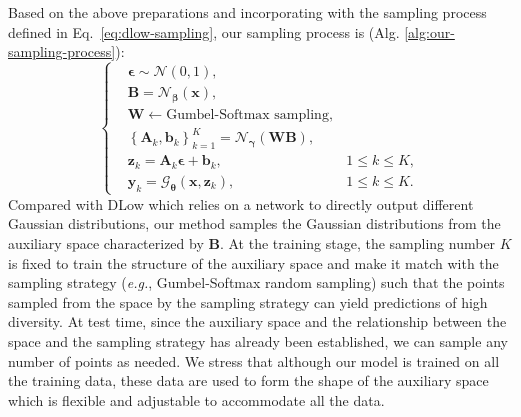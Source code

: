 \documentclass[sigconf,screen,nonacm]{acmart}
\begin{document}
	Based on the above preparations and incorporating with the sampling process defined in Eq.~\ref{eq:dlow-sampling}, our sampling process is (Alg. \ref{alg:our-sampling-process}):
	\begin{equation}
		\label{eq:slab-sampling}
		\left\{
		\begin{aligned}
			&\bm{\epsilon}  \sim \mathcal{N}(0,1), \\
			&\mathbf{B} = \mathcal{N}_{\bm{\beta}}(\mathbf{x}), \\
			&\mathbf{W} \leftarrow \text{Gumbel-Softmax sampling}, \\
			&\left\{\mathbf{A}_k,\mathbf{b}_k\right\}_{k=1}^K = \mathcal{N}_{\bm{\gamma}}(\mathbf{W}\mathbf{B}), \\
			&\mathbf{z}_k  = \mathbf{A}_k \mathbf{\bm{\epsilon}} + \mathbf{b}_k, &1\leq k \leq K,\\
			&\mathbf{y}_k  = \mathcal{G}_{\bm{\theta}}(\mathbf{x},\mathbf{z}_k), &1\leq k \leq K.
		\end{aligned}
		\right.
	\end{equation}
	Compared with DLow which relies on a network to directly output different Gaussian distributions, our method samples the Gaussian distributions from the auxiliary space characterized by $\mathbf{B}$. At the training stage, the sampling number $K$ is fixed to train the structure of the auxiliary space and make it match with the sampling strategy (\textit{e.g.}, Gumbel-Softmax random sampling) such that the points sampled from the space by the sampling strategy can yield predictions of high diversity. At test time, since the auxiliary space and the relationship between the space and the sampling strategy has already been established, we can sample any number of points as needed. We stress that although our model is trained on all the training data, these data are used to form the shape of the auxiliary space which is flexible and adjustable to accommodate all the data.
	
\end{document}
